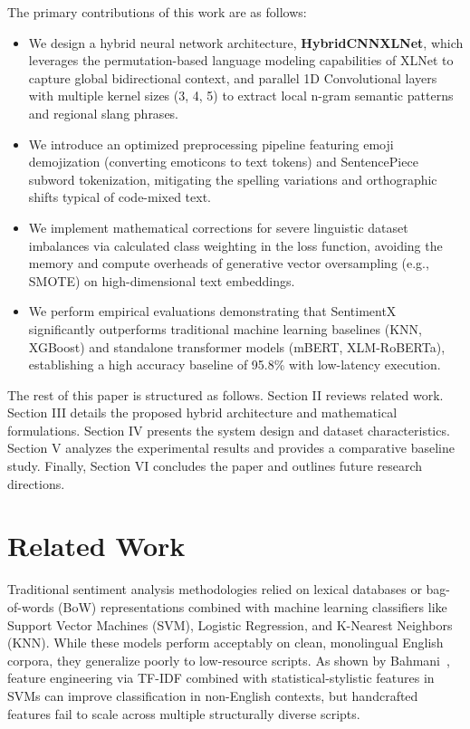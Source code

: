 \documentclass[conference]{IEEEtran}
\begin{document}
The primary contributions of this work are as follows:
\begin{itemize}
    \item We design a hybrid neural network architecture, \textbf{HybridCNNXLNet}, which leverages the permutation-based language modeling capabilities of XLNet to capture global bidirectional context, and parallel 1D Convolutional layers with multiple kernel sizes (3, 4, 5) to extract local n-gram semantic patterns and regional slang phrases.
    \item We introduce an optimized preprocessing pipeline featuring emoji demojization (converting emoticons to text tokens) and SentencePiece subword tokenization, mitigating the spelling variations and orthographic shifts typical of code-mixed text.
    \item We implement mathematical corrections for severe linguistic dataset imbalances via calculated class weighting in the loss function, avoiding the memory and compute overheads of generative vector oversampling (e.g., SMOTE) on high-dimensional text embeddings.
    \item We perform empirical evaluations demonstrating that SentimentX significantly outperforms traditional machine learning baselines (KNN, XGBoost) and standalone transformer models (mBERT, XLM-RoBERTa), establishing a high accuracy baseline of 95.8\% with low-latency execution.
\end{itemize}

The rest of this paper is structured as follows. Section II reviews related work. Section III details the proposed hybrid architecture and mathematical formulations. Section IV presents the system design and dataset characteristics. Section V analyzes the experimental results and provides a comparative baseline study. Finally, Section VI concludes the paper and outlines future research directions.

\section{Related Work}
Traditional sentiment analysis methodologies relied on lexical databases or bag-of-words (BoW) representations combined with machine learning classifiers like Support Vector Machines (SVM), Logistic Regression, and K-Nearest Neighbors (KNN). While these models perform acceptably on clean, monolingual English corpora, they generalize poorly to low-resource scripts. As shown by Bahmani~\cite{bahmani2025tfidf}, feature engineering via TF-IDF combined with statistical-stylistic features in SVMs can improve classification in non-English contexts, but handcrafted features fail to scale across multiple structurally diverse scripts.
\end{document}

